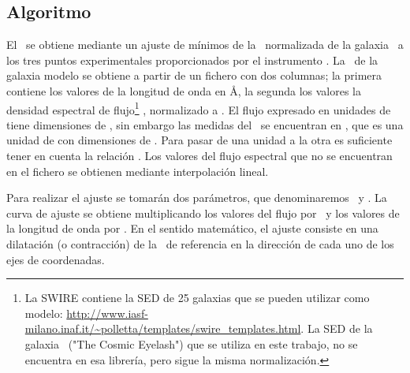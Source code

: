 \newpage
\subsection{Algoritmo}

El \rt\ se obtiene mediante un ajuste de mínimos  de la \sed\ normalizada de la galaxia \smm\ a los tres puntos experimentales proporcionados por el instrumento \spire. 
La \sed\ de la galaxia modelo se obtiene a partir de un fichero con dos columnas; la primera contiene los valores de la longitud de onda en \AA, la segunda los valores la densidad espectral de flujo\footnote{La SWIRE  contiene la SED de 25 galaxias que se pueden utilizar como modelo: \url{http://www.iasf-milano.inaf.it/~polletta/templates/swire_templates.html}. La SED de la galaxia \smm\ ("The Cosmic Eyelash") que se utiliza en este trabajo, no se encuentra en esa librería, pero sigue la misma normalización.} , normalizado a . El flujo expresado en unidades de  tiene dimensiones de \maths{\mathrm{[M\,{L}^{-1}\,{T}^{-3} ]}}, sin embargo las medidas del \spire\ se encuentran en \jy{}, que es una unidad de  con dimensiones de \maths{\mathrm{[M \,{T}^{-2} }]}. Para pasar de una unidad a la otra es suficiente tener en cuenta la relación  . Los valores del flujo espectral que no se encuentran en el fichero se obtienen mediante interpolación lineal.

Para realizar el ajuste se tomarán dos parámetros, que denominaremos \paramc\ y \paramk. La curva de ajuste se obtiene multiplicando los valores del flujo por \paramc\ y los valores de la longitud de onda por \paramk.
En el sentido matemático, el ajuste consiste en una dilatación (o contracción) de la \sed\ de referencia en la dirección de cada uno de los ejes de coordenadas.

